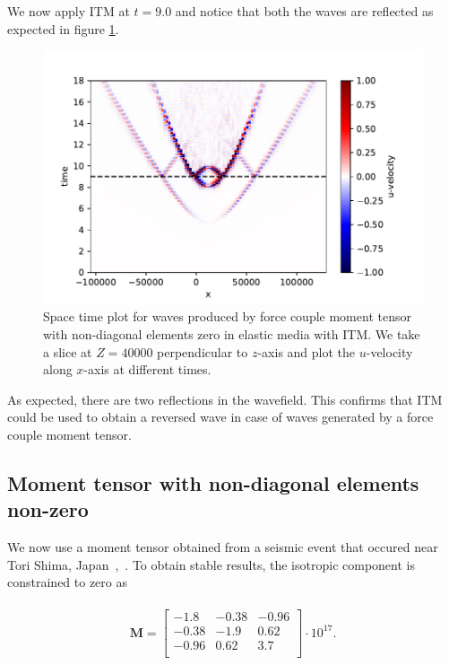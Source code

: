 We now apply \ac{ITM} at $t=9.0$ and notice that both the waves are reflected as expected in figure \ref{fig:space-timeplot-doublecouplediagITM}.

\begin{figure}[!htpb]
    \centering
    \includegraphics[width=0.8\linewidth]{figures/double-couple-diag.pdf}
    \caption{Space time plot for waves produced by force couple moment tensor with non-diagonal elements zero in elastic media with \ac{ITM}. We take a slice at $Z=40000$ perpendicular to $z$-axis and plot the $u$-velocity along $x$-axis at different times.}
    \label{fig:space-timeplot-doublecouplediagITM}
\end{figure}
As expected, there are two reflections in the wavefield. This confirms that \ac{ITM} could be used to obtain a reversed wave in case of waves generated by a force couple moment tensor.

\subsection{Moment tensor with non-diagonal elements non-zero}
We now use a moment tensor obtained from a seismic event that occured near Tori Shima, Japan~\parencite{kanamori},~\parencite{shearer_2019}. 
To obtain stable results, the isotropic component is constrained to zero as

\begin{align}
    \begin{split}
        \mathbf{M} =
            \begin{bmatrix}
                -1.8 & -0.38 & -0.96 \\
                -0.38 & -1.9 & 0.62 \\
                -0.96 & 0.62 & 3.7 \\
            \end{bmatrix} \cdot 10^{17} .
    \end{split}
\end{align}

